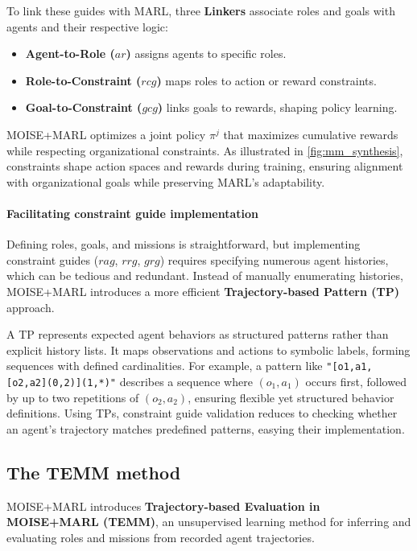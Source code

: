 \documentclass[pdflatex,sn-mathphys-num]{sn-jnl}%
\theoremstyle{thmstyleone}%
\theoremstyle{thmstyletwo}%
\theoremstyle{thmstylethree}%
\begin{document}
To link these guides with MARL, three \textbf{Linkers} associate roles and goals with agents and their respective logic:
\begin{itemize}
    \item \textbf{Agent-to-Role ($ar$)} assigns agents to specific roles.
    \item \textbf{Role-to-Constraint ($rcg$)} maps roles to action or reward constraints.
    \item \textbf{Goal-to-Constraint ($gcg$)} links goals to rewards, shaping policy learning.
\end{itemize}

MOISE+MARL optimizes a joint policy $\pi^{j}$ that maximizes cumulative rewards while respecting organizational constraints. As illustrated in \autoref{fig:mm_synthesis}, constraints shape action spaces and rewards during training, ensuring alignment with organizational goals while preserving MARL's adaptability.

\paragraph{Facilitating constraint guide implementation}

Defining roles, goals, and missions is straightforward, but implementing constraint guides ($rag$, $rrg$, $grg$) requires specifying numerous agent histories, which can be tedious and redundant. Instead of manually enumerating histories, MOISE+MARL introduces a more efficient \textbf{Trajectory-based Pattern (TP)} approach.

A TP represents expected agent behaviors as structured patterns rather than explicit history lists. It maps observations and actions to symbolic labels, forming sequences with defined cardinalities. For example, a pattern like \texttt{"[o1,a1,[o2,a2](0,2)](1,*)"} describes a sequence where $(o_1, a_1)$ occurs first, followed by up to two repetitions of $(o_2, a_2)$, ensuring flexible yet structured behavior definitions.
Using TPs, constraint guide validation reduces to checking whether an agent's trajectory matches predefined patterns, easying their implementation.


\subsection{The TEMM method}

MOISE+MARL introduces \textbf{Trajectory-based Evaluation in MOISE+MARL (TEMM)}, an unsupervised learning method for inferring and evaluating roles and missions from recorded agent trajectories.
\end{document}
